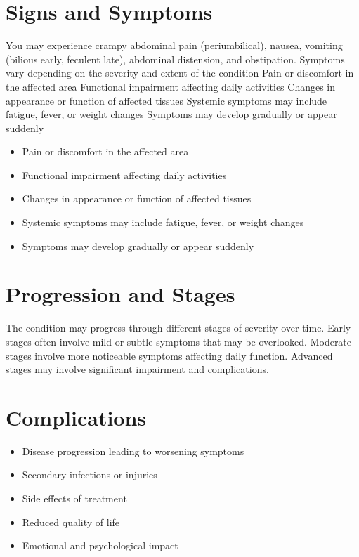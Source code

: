 \section{Signs and Symptoms}
You may experience crampy abdominal pain (periumbilical), nausea, vomiting (bilious early, feculent late), abdominal distension, and obstipation. Symptoms vary depending on the severity and extent of the condition Pain or discomfort in the affected area Functional impairment affecting daily activities Changes in appearance or function of affected tissues Systemic symptoms may include fatigue, fever, or weight changes Symptoms may develop gradually or appear suddenly

\begin{itemize}[noitemsep]
  \item Pain or discomfort in the affected area
  \item Functional impairment affecting daily activities
  \item Changes in appearance or function of affected tissues
  \item Systemic symptoms may include fatigue, fever, or weight changes
  \item Symptoms may develop gradually or appear suddenly
\end{itemize}
\section{Progression and Stages}
The condition may progress through different stages of severity over time. Early stages often involve mild or subtle symptoms that may be overlooked. Moderate stages involve more noticeable symptoms affecting daily function. Advanced stages may involve significant impairment and complications.
\section{Complications}
\begin{itemize}[noitemsep]
  \item Disease progression leading to worsening symptoms
  \item Secondary infections or injuries
  \item Side effects of treatment
  \item Reduced quality of life
  \item Emotional and psychological impact
\end{itemize}
